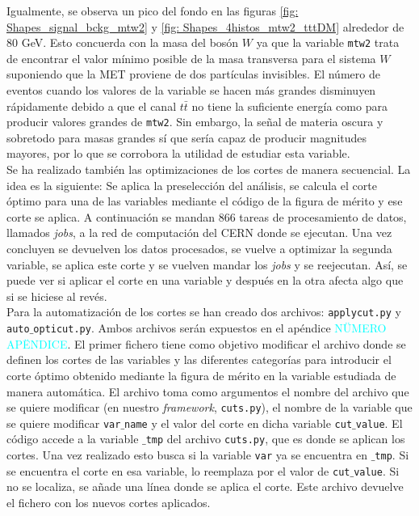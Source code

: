 Igualmente, se observa un pico del fondo en las figuras \ref{fig: Shapes_signal_bckg_mtw2} y \ref{fig: Shapes_4histos_mtw2_tttDM} alrededor de 80 GeV. Esto concuerda con la masa del bosón $W$ ya que la variable \texttt{mtw2} trata de encontrar el valor mínimo posible de la masa transversa para el sistema $W$ suponiendo que la MET proviene de dos partículas invisibles. El número de eventos cuando los valores de la variable se hacen más grandes disminuyen rápidamente debido a que el canal $t\bar{t}$ no tiene la suficiente energía como para producir valores grandes de \texttt{mtw2}. Sin embargo, la señal de materia oscura y sobretodo para masas grandes sí que sería capaz de producir magnitudes mayores, por lo que se corrobora la utilidad de estudiar esta variable.\\

Se ha realizado también las optimizaciones de los cortes de manera secuencial. La idea es la siguiente: Se aplica la preselección del análisis, se calcula el corte óptimo para una de las variables mediante el código de la figura de mérito y ese corte se aplica. A continuación se mandan 866 tareas de procesamiento de datos, llamados \textit{jobs}, a la red de computación del CERN donde se ejecutan. Una vez concluyen se devuelven los datos procesados, se vuelve a optimizar la segunda variable, se aplica este corte y se vuelven mandar los \textit{jobs} y se reejecutan. Así, se puede ver si aplicar el corte en una variable y después en la otra afecta algo que si se hiciese al revés. \\



Para la automatización de los cortes se han creado dos archivos: \texttt{applycut.py} y \texttt{auto$\_$opticut.py}. Ambos archivos serán expuestos en el apéndice \textcolor{cyan}{NÜMERO APËNDICE}. El primer fichero tiene como objetivo modificar el archivo donde se definen los cortes de las variables y las diferentes categorías para introducir el corte óptimo obtenido mediante la figura de mérito en la variable estudiada de manera automática. El archivo toma como argumentos el nombre del archivo que se quiere modificar (en nuestro \textit{framework}, \texttt{cuts.py}), el nombre de la variable que se quiere modificar \texttt{var$\_$name} y el valor del corte en dicha variable \texttt{cut$\_$value}. El código accede a la variable \texttt{$\_$tmp} del archivo \texttt{cuts.py}, que es donde se aplican los cortes. Una vez realizado esto busca si la variable \texttt{var} ya se encuentra en \texttt{$\_$tmp}. Si se encuentra el corte en esa variable, lo reemplaza por el valor de \texttt{cut$\_$value}. Si no se localiza, se añade una línea donde se aplica el corte. Este archivo devuelve el fichero con los nuevos cortes aplicados.\\

